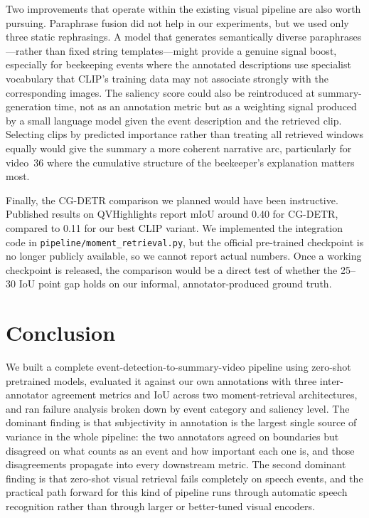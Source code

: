 \documentclass[sigconf, nonacm]{acmart}
\begin{document}
Two improvements that operate within the existing visual pipeline are also
worth pursuing. Paraphrase fusion did not help in our experiments, but we
used only three static rephrasings. A model that generates
semantically diverse paraphrases---rather than fixed string templates---might
provide a genuine signal boost, especially for beekeeping events where the
annotated descriptions use specialist vocabulary that CLIP's training data
may not associate strongly with the corresponding images. The saliency score
could also be reintroduced at summary-generation time, not as an annotation
metric but as a weighting signal produced by a small language model given
the event description and the retrieved clip. Selecting clips by predicted
importance rather than treating all retrieved windows equally would give the
summary a more coherent narrative arc, particularly for video~36 where the
cumulative structure of the beekeeper's explanation matters most.

Finally, the CG-DETR comparison we planned would have been instructive.
Published results on QVHighlights report mIoU around 0.40 for CG-DETR,
compared to 0.11 for our best CLIP variant. We implemented the integration code in
\texttt{pipeline/\allowbreak moment\_retrieval.py}, but the official
pre-trained checkpoint is no longer publicly available, so we
cannot report actual numbers. Once a working checkpoint is released, the
comparison would be a direct test of whether the 25--30 IoU point gap
holds on our informal, annotator-produced ground truth.

\section{Conclusion}

We built a complete event-detection-to-summary-video pipeline using
zero-shot pretrained models, evaluated it against our own annotations with
three inter-annotator agreement metrics and IoU across two moment-retrieval
architectures, and ran failure analysis broken down by event category and
saliency level. The dominant finding is that subjectivity in annotation
is the largest single source of variance in the whole pipeline: the two
annotators agreed on boundaries but disagreed on what counts as an event
and how important each one is, and those disagreements propagate into every
downstream metric. The second dominant finding is that zero-shot visual
retrieval fails completely on speech events, and the practical path forward
for this kind of pipeline runs through automatic speech recognition rather
than through larger or better-tuned visual encoders.
\end{document}
